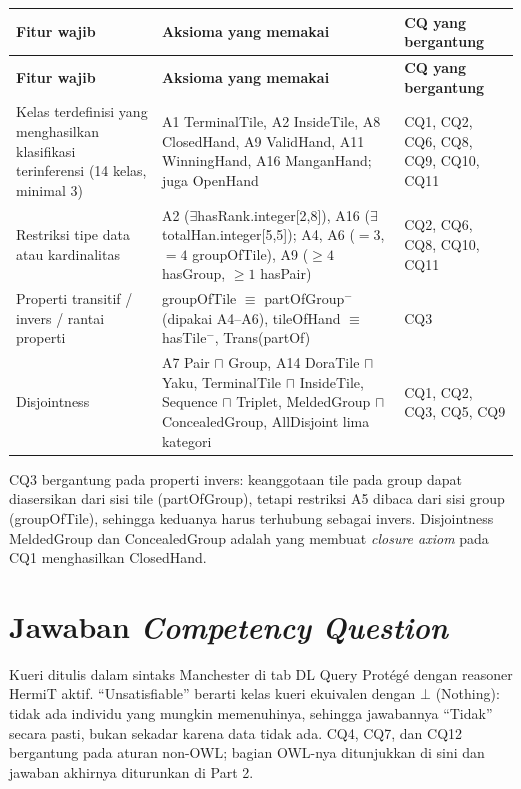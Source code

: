 \documentclass[11pt,a4paper]{article}
\begin{document}
\begin{longtable}{@{}p{4.6cm} p{5.8cm} p{3.4cm}@{}}
\toprule
\textbf{Fitur wajib} & \textbf{Aksioma yang memakai} & \textbf{CQ yang bergantung} \\
\midrule
\endfirsthead
\toprule
\textbf{Fitur wajib} & \textbf{Aksioma yang memakai} & \textbf{CQ yang bergantung} \\
\midrule
\endhead
Kelas terdefinisi yang menghasilkan klasifikasi terinferensi (14 kelas, minimal 3) & A1 TerminalTile, A2 InsideTile, A8 ClosedHand, A9 ValidHand, A11 WinningHand, A16 ManganHand; juga OpenHand & CQ1, CQ2, CQ6, CQ8, CQ9, CQ10, CQ11 \\
Restriksi tipe data atau kardinalitas & A2 ($\exists$hasRank.integer[2,8]), A16 ($\exists$totalHan.integer[5,5]); A4, A6 (${=}3$, ${=}4$ groupOfTile), A9 (${\geq}4$ hasGroup, ${\geq}1$ hasPair) & CQ2, CQ6, CQ8, CQ10, CQ11 \\
Properti transitif / invers / rantai properti & groupOfTile $\equiv$ partOfGroup$^{-}$ (dipakai A4--A6), tileOfHand $\equiv$ hasTile$^{-}$, Trans(partOf) & CQ3 \\
Disjointness & A7 Pair $\sqcap$ Group, A14 DoraTile $\sqcap$ Yaku, TerminalTile $\sqcap$ InsideTile, Sequence $\sqcap$ Triplet, MeldedGroup $\sqcap$ ConcealedGroup, AllDisjoint lima kategori & CQ1, CQ2, CQ3, CQ5, CQ9 \\
\midrule
\bottomrule
\end{longtable}

CQ3 bergantung pada properti invers: keanggotaan tile pada group dapat diasersikan
dari sisi tile (partOfGroup), tetapi restriksi A5 dibaca dari sisi group
(groupOfTile), sehingga keduanya harus terhubung sebagai invers. Disjointness
MeldedGroup dan ConcealedGroup adalah yang membuat \emph{closure axiom} pada CQ1
menghasilkan ClosedHand.

\section{Jawaban \emph{Competency Question}}

Kueri ditulis dalam sintaks Manchester di tab DL Query Protégé dengan reasoner
HermiT aktif. ``Unsatisfiable'' berarti kelas kueri ekuivalen dengan
$\bot$ (Nothing): tidak ada individu yang mungkin memenuhinya, sehingga jawabannya
``Tidak'' secara pasti, bukan sekadar karena data tidak ada. CQ4, CQ7, dan CQ12
bergantung pada aturan non-OWL; bagian OWL-nya ditunjukkan di sini dan jawaban
akhirnya diturunkan di Part 2.
\end{document}
